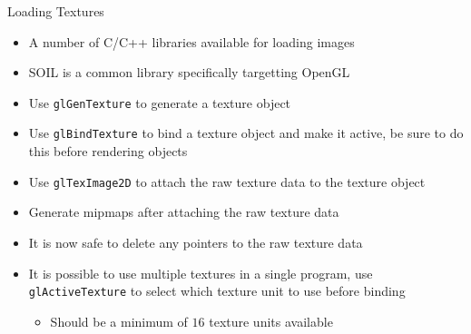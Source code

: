 \documentclass{beamer}
\begin{document}
\begin{frame}[fragile]{Loading Textures}
    \begin{itemize}
        \item A number of C/C++ libraries available for loading images 
        \item SOIL is a common library specifically targetting OpenGL
        \item Use {\color{blue}\verb"glGenTexture"} to generate a texture object
        \item Use {\color{blue}\verb"glBindTexture"} to bind a texture object and make it active, be sure to do this 
            before rendering objects
        \item Use {\color{blue}\verb"glTexImage2D"} to attach the raw texture data to the texture object
        \item Generate mipmaps after attaching the raw texture data
        \item It is now safe to delete any pointers to the raw texture data
        \item It is possible to use multiple textures in a single program, use {\color{blue}\verb"glActiveTexture"} to 
            select which texture unit to use before binding
        \begin{itemize}
            \item Should be a minimum of $16$ texture units available
        \end{itemize}
    \end{itemize}
\end{frame}
\end{document}
